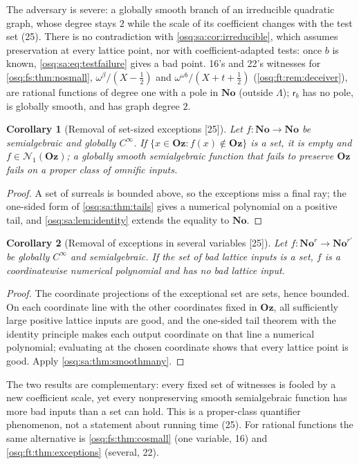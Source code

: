 \documentclass[11pt,letterpaper]{article}
\numberwithin{equation}{section}
\newtheorem{corollary}[corollary]{Corollary}
\theoremstyle{definition}
\theoremstyle{remark}
\theoremstyle{plain}
\newcommand{\No}{\mathbf{No}}
\newcommand{\Oz}{\mathbf{Oz}}
\newcommand{\Num}{\mathscr N}
\newcommand{\src}[1]{\textup{\textsf{[#1]}}}
\begin{document}
The adversary is severe: a globally smooth branch of an irreducible quadratic graph, whose degree stays $2$ while the scale of its coefficient changes with
the test set (25). There is no contradiction with \cref{osq:sa:cor:irreducible}, which assumes preservation at every lattice point, nor with
coefficient-adapted tests: once $b$ is known, \eqref{osq:sa:eq:testfailure} gives a bad point. 16's and 22's witnesses for \cref{osq:fs:thm:nosmall},
$\omega^\beta/(X-\frac12)$ and $\omega^{\omega b}/(X+t+\frac12)$ (\cref{osq:ft:rem:deceiver}), are rational functions of degree one with a pole in $\No$
(outside $\Lambda$); $\mathsf r_b$ has no pole, is globally smooth, and has graph degree $2$.

\begin{corollary}[Removal of set-sized exceptions \src{25}]\label{osq:sa:cor:exceptions}
Let $f:\No\to\No$ be semialgebraic and globally $C^\infty$. If $\{x\in\Oz:f(x)\notin\Oz\}$ is a set, it is empty and $f\in\Num_1(\Oz)$; a globally smooth
semialgebraic function that fails to preserve $\Oz$ fails on a proper class of omnific inputs.
\end{corollary}
\begin{proof}
A set of surreals is bounded above, so the exceptions miss a final ray; the one-sided form of \cref{osq:sa:thm:tails} gives a numerical polynomial on a
positive tail, and \cref{osq:sa:lem:identity} extends the equality to $\No$.
\end{proof}

\begin{corollary}[Removal of exceptions in several variables \src{25}]\label{osq:sa:cor:exceptionsmany}
Let $f:\No^r\to\No^{r'}$ be globally $C^\infty$ and semialgebraic. If the set of bad lattice inputs is a set, $f$ is a coordinatewise numerical polynomial
and has no bad lattice input.
\end{corollary}
\begin{proof}
The coordinate projections of the exceptional set are sets, hence bounded. On each coordinate line with the other coordinates fixed in $\Oz$, all
sufficiently large positive lattice inputs are good, and the one-sided tail theorem with the identity principle makes each output coordinate on that line a
numerical polynomial; evaluating at the chosen coordinate shows that every lattice point is good. Apply \cref{osq:sa:thm:smoothmany}.
\end{proof}

The two results are complementary: every fixed set of witnesses is fooled by a new coefficient scale, yet every nonpreserving smooth semialgebraic function
has more bad inputs than a set can hold. This is a proper-class quantifier phenomenon, not a statement about running time (25). For rational functions the
same alternative is \cref{osq:fs:thm:cosmall} (one variable, 16) and \cref{osq:ft:thm:exceptions} (several, 22).
\end{document}
